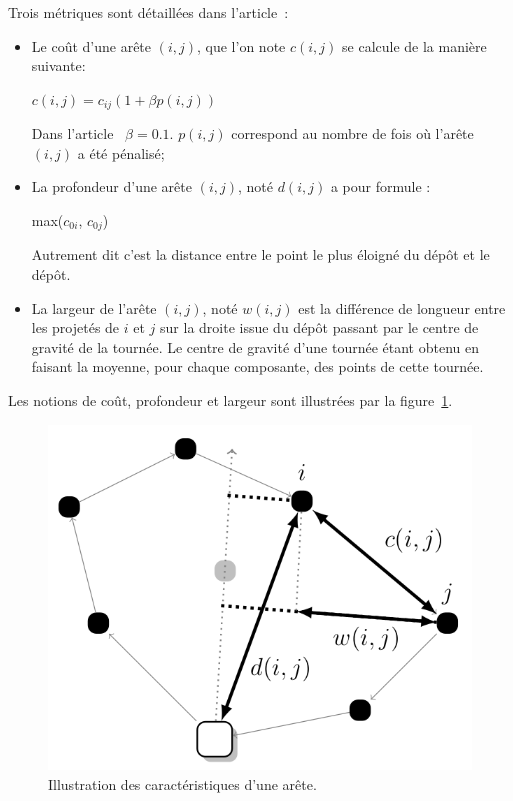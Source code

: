 \documentclass[a4paper,11pt]{article}%
\begin{document}
Trois métriques sont détaillées dans l'article~\cite{Sorensen_2017}:
\begin{itemize}
\item Le coût d'une arête $(i,j)$, que l'on note $c(i,j)$ se calcule de la manière suivante:

\begin{center}
$c(i,j) = c_{ij}(1 + \beta p(i,j))$ 
\end{center}

Dans l'article~\cite{Sorensen_2017} $\beta = 0.1$. $p(i,j)$ correspond au nombre de fois où l'arête $(i,j)$ a été pénalisé;
\item La profondeur d'une arête $(i,j)$, noté $d(i,j)$ a pour formule :

\begin{center}
max($c_{0i}$, $c_{0j}$)
\end{center}

Autrement dit c'est la distance entre le point le plus éloigné du dépôt et le dépôt.
\item La largeur de l'arête $(i,j)$, noté $w(i,j)$ est la différence de longueur entre les projetés de $i$ et $j$ sur la droite issue du dépôt passant par le centre de gravité de la tournée. Le centre de gravité d'une tournée étant obtenu en faisant la moyenne, pour chaque composante, des points de cette tournée.
\end{itemize}

Les notions de coût, profondeur et largeur sont illustrées par la figure~\ref{metrics}. 

\begin{figure}
\centering
\includegraphics[scale=0.3]{metrics_big.png}
\caption{Illustration des caractéristiques d'une arête.}
\label{metrics}
\end{figure}
\end{document}
